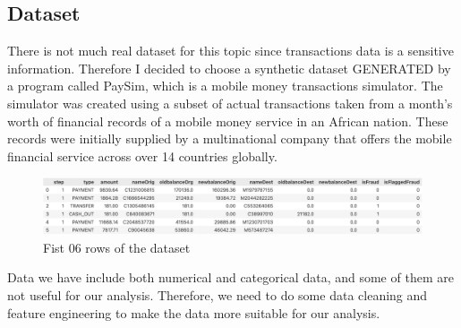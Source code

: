 \subsection{Dataset}
There is not much real dataset for this topic since transactions data is a sensitive information. Therefore I decided to choose a synthetic dataset GENERATED by a program called PaySim, which is a mobile money transactions simulator. The simulator was created using a subset of actual transactions taken from a month's worth of financial records of a mobile money service in an African nation. These records were initially supplied by a multinational company that offers the mobile financial service across over 14 countries globally.

\begin{figure}
  \centering
  \includegraphics[width=\linewidth]{body/02_methodology/img/figure1.png}
  \caption{Fist 06 rows of the dataset}
\end{figure}

Data we have include both numerical and categorical data, and some of them are not useful for our analysis. Therefore, we need to do some data cleaning and feature engineering to make the data more suitable for our analysis.